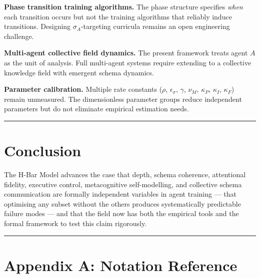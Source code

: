 \documentclass[11pt,a4paper]{article}
\begin{document}
\textbf{Phase transition training algorithms.} The phase structure
specifies \emph{when} each transition occurs but not the training
algorithms that reliably induce transitions. Designing $\sigma_A$-targeting
curricula remains an open engineering challenge.

\textbf{Multi-agent collective field dynamics.} The present framework
treats agent $A$ as the unit of analysis. Full multi-agent systems
require extending to a collective knowledge field with emergent schema
dynamics.

\textbf{Parameter calibration.} Multiple rate constants ($\rho$,
$\epsilon_\sigma$, $\gamma$, $\nu_M$, $\kappa_P$, $\kappa_I$, $\kappa_F$)
remain unmeasured. The dimensionless parameter groups reduce independent
parameters but do not eliminate empirical estimation needs.

\noindent\rule{\linewidth}{0.4pt}

\section{Conclusion}\label{sec:conclusion}

The H-Bar Model advances the case that depth, schema coherence,
attentional fidelity, executive control, metacognitive self-modelling,
and collective schema communication are formally independent variables
in agent training --- that optimising any subset without the others
produces systematically predictable failure modes --- and that the field
now has both the empirical tools and the formal framework to test this
claim rigorously.

\noindent\rule{\linewidth}{0.4pt}

\section*{Appendix A: Notation Reference}\label{app:notation}
\end{document}
